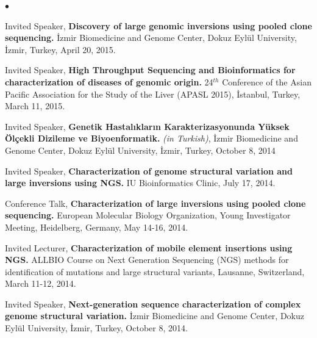 \documentclass[margin,line]{res}
\newenvironment{list2}{
  \begin{list}{$\bullet$}{%
      \setlength{\itemsep}{0in}
      \setlength{\parsep}{0in} \setlength{\parskip}{0in}
      \setlength{\topsep}{0in} \setlength{\partopsep}{0in} 
      \setlength{\leftmargin}{0.2in}}}{\end{list}}
\begin{document}
\begin{resume}
\begin{list2}
  \clearpage
\item
  Invited Speaker, 
  {\bf Discovery of large genomic inversions using pooled clone sequencing.}
  İzmir Biomedicine and Genome Center, Dokuz Eylül University, İzmir, Turkey, April 20, 2015.
\item
  Invited Speaker, 
  {\bf High Throughput Sequencing and Bioinformatics for characterization of diseases of genomic origin.}
  24$^{th}$ Conference of the Asian Pacific Association for the Study of the Liver (APASL 2015), İstanbul, Turkey, March 11, 2015.

\item
  Invited Speaker, 
  {\bf Genetik Hastalıkların Karakterizasyonunda Yüksek Ölçekli Dizileme ve Biyoenformatik.} {\it (in Turkish)},
  İzmir Biomedicine and Genome Center, Dokuz Eylül University, İzmir, Turkey, October 8, 2014

\item
  Invited Speaker, 
  {\bf Characterization of  genome structural variation and large inversions using NGS.}
  IU Bioinformatics Clinic, July 17, 2014. 

\item
  Conference Talk, 
  {\bf Characterization of large inversions using pooled clone sequencing.}
  European Molecular Biology Organization, Young Investigator Meeting, Heidelberg, Germany, May 14-16, 2014.


\item
  Invited Lecturer, 
  {\bf Characterization of mobile element insertions using NGS.}
  ALLBIO Course on Next Generation Sequencing (NGS) methods for identification of mutations and large structural variants,
  Lausanne, Switzerland, March 11-12, 2014.
\item
  Invited Speaker, 
  {\bf  Next-generation sequence characterization of complex genome structural variation.}
  İzmir Biomedicine and Genome Center, Dokuz Eylül University, İzmir, Turkey, October 8, 2014.


\end{list2}
\end{resume}
\end{document}
